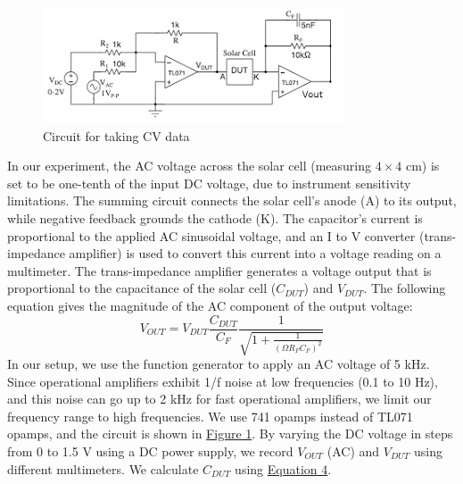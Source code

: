 	\begin{figure}
		\centering
		\includegraphics[width=0.8\columnwidth]{images/th1.png}
		\caption{Circuit for taking CV data}
		\label{th:1}
	\end{figure}

	In our experiment, the AC voltage across the solar cell (measuring $4\times4$ cm) is set to be one-tenth of the input DC voltage, due to instrument sensitivity limitations. The summing circuit connects the solar cell's anode (A) to its output, while negative feedback grounds the cathode (K). The capacitor's current is proportional to the applied AC sinusoidal voltage, and an I to V converter (trans-impedance amplifier) is used to convert this current into a voltage reading on a multimeter. The trans-impedance amplifier generates a voltage output that is proportional to the capacitance of the solar cell ($C_{DUT}$) and $V_{DUT}$. The following equation gives the magnitude of the AC component of the output voltage: 
	\begin{equation}
		V_{OUT}=V_{DUT}\frac{C_{DUT}}{C_F}\frac{1}{\sqrt{1+\frac{1}{(\Omega R_F C_F)^2}}}
		\label{eq:5}
	\end{equation}
	In our setup, we use the function generator to apply an AC voltage of 5 kHz. Since operational amplifiers exhibit 1/f noise at low frequencies (0.1 to 10 Hz), and this noise can go up to 2 kHz for fast operational amplifiers, we limit our frequency range to high frequencies. We use 741 opamps instead of TL071 opamps, and the circuit is shown in \hyperref[th:1]{Figure 1}. By varying the DC voltage in steps from 0 to 1.5 V using a DC power supply, we record $V_{OUT}$ (AC) and $V_{DUT}$ using different multimeters. We calculate $C_{DUT}$ using \hyperref[eq:4]{Equation 4}.
